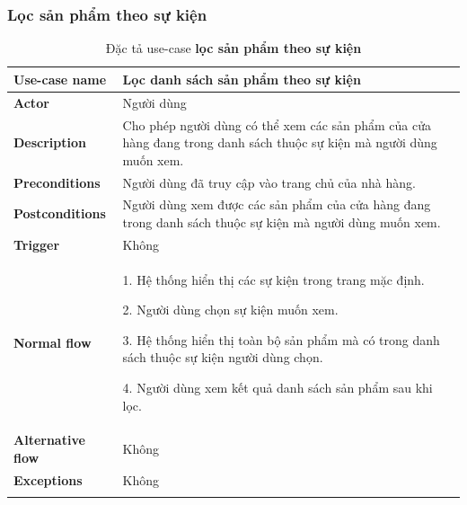 \subsubsection{Lọc sản phẩm theo sự kiện }
\begin{center}
    {
        \setlength\extrarowheight{6pt}
        \begin{longtable}{| p{} | p{} |}
            \hline
            \textbf{Use-case name}
             &
            Lọc danh sách sản phẩm theo sự kiện
            \\
            \hline
            \textbf{Actor}
             &
            Người dùng
            \\
            \hline
            \textbf{Description}
             &
            Cho phép người dùng có thể xem các sản phẩm của cửa hàng đang trong danh sách thuộc sự kiện mà người dùng muốn xem.
            \\
            \hline
            \textbf{Preconditions}
             &
            Người dùng đã truy cập vào trang chủ của nhà hàng.
            \\
            \hline
            \textbf{Postconditions}
             &
            Người dùng xem được các sản phẩm của cửa hàng đang trong danh sách thuộc sự kiện mà người dùng muốn xem.
            \\
            \hline
            \textbf{Trigger}
             &
            Không
            \\
            \hline
            \textbf{Normal flow}
             &
            1. Hệ thống hiển thị các sự kiện trong trang mặc định.

            2. Người dùng chọn sự kiện muốn xem.

            3. Hệ thống hiển thị toàn bộ sản phẩm mà có trong danh sách thuộc sự kiện người dùng chọn.

            4. Người dùng xem kết quả danh sách sản phẩm sau khi lọc.
            \\
            \hline
            \textbf{Alternative flow}
             &
            Không
            \\
            \hline
            \textbf{Exceptions}
             &
            Không
            \\
            \hline
            \caption{Đặc tả use-case \textbf{lọc sản phẩm theo sự kiện}}
        \end{longtable}
    }
\end{center}


